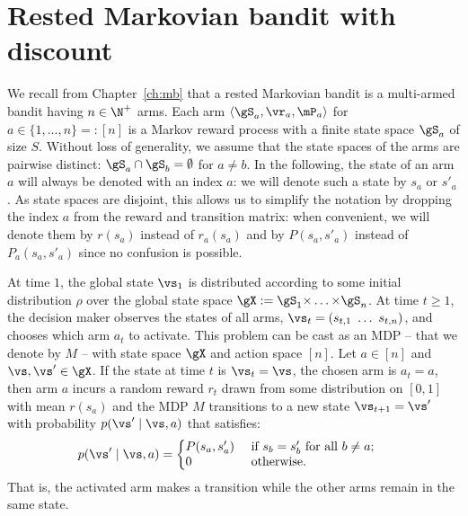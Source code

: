 \section{Rested Markovian bandit with discount}
\label{ch:rested:sec:bandits}


We recall from Chapter~\ref{ch:mb} that a rested Markovian bandit is a multi-armed bandit having $n\in\N^+$ arms. Each arm $\langle\gS_a,\vr_a,\mP_a\rangle$ for $a\in\{1,\dots, n\}=:[n]$ is a Markov
reward process with a finite state space $\gS_a$ of size $S$. %
Without loss of generality, we assume
that the state spaces of the arms are pairwise distinct:
$\gS_a\cap\gS_b=\emptyset$ for $a\ne b$. In the following, the state of an
arm $a$ will always be denoted with an index $a$: we will denote such a
state by $s_a$ or $s'_a$. As state spaces are disjoint, this allows us to
simplify the notation by dropping the index $a$ from the reward and transition
matrix: when convenient, we will denote them by $r(s_a)$ instead of $r_a(s_a)$
and by $P(s_a,s'_a)$ instead of $P_a(s_a,s'_a)$ since no confusion is possible. 

At time $1$, the global state $\vs_1$ is distributed according to some initial
distribution $\rho$ over the global state space $\gX :=
\gS_1{\times}\dots{\times}\gS_n$. At time $t\ge 1$, the decision maker observes
the states
of all arms,
$\vs_t=(s_{t,1}\ \dots\ s_{t,n})$, and chooses which arm $a_t$ to activate.
This problem can be cast as an MDP -- that we denote by $M$ -- with state
space $\gX$ and action space \([n]\). Let $a\in[n]$ and $\vs,\vs'\in\gX$. If the state at time $t$ is $\vs_t=\vs$, the chosen arm is $a_t=a$, then arm $a$ incurs a random reward $r_t$ drawn from some distribution on \([0,1]\) with
mean \(r(s_a)\) and the MDP $M$ transitions to a new state $\vs_{t+1}=\vs'$ with probability \(p(\vs'\mid \vs,a)\) that satisfies:
\begin{align}
    \label{eq:defP}
    p(\vs' \mid \vs,a) 
    &= 
    \left\{
        \begin{array}{@{}ll@{}}
            P(s_a,s'_a) & \text{ if $s_{b}=s'_{b}$ for all $b\ne a$;}\\
            0 &\text{ otherwise}.
        \end{array}
    \right.
\end{align}
That is, the activated arm makes a transition while the other arms remain in
the same state.

